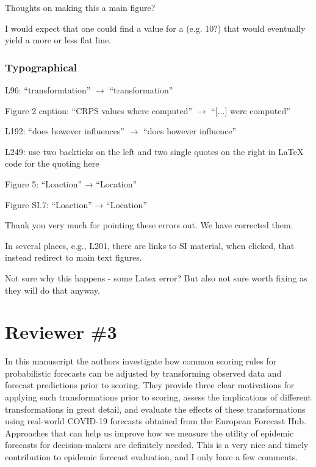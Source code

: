 \documentclass{article}
\newcommand{\red}{\color{red}}
\newcommand{\black}{\color{black}}
\newcommand{\blue}{\color{blue}}
\begin{document}
Thoughts on making this a main figure? 

I would expect that one could find a value for a (e.g. 10?) that would eventually yield a more or less flat line. 

\blue
\subsubsection{Typographical}
\blue
L96: “transformtation” $\xrightarrow{}$ “transformation”

Figure 2 caption: “CRPS values where computed” $\xrightarrow{}$ “[...] were computed”

L192: “does however influences” $\xrightarrow{}$ “does however influence”

L249: use two backticks on the left and two single quotes on the right in LaTeX code for the quoting here




Figure 5: “Loaction” → “Location”

Figure SI.7: “Loaction” → “Location”

\black
Thank you very much for pointing these errors out. We have corrected them. 


\red
In several places, e.g., L201, there are links to SI material, when clicked, that instead redirect to main text figures.

\black
Not sure why this happens - some Latex error? But also not sure worth fixing as they will do that anyway. 


















\red
\section{Reviewer \#3}

\blue
In this manuscript the authors investigate how common scoring rules for probabilistic forecasts can be adjusted by transforming observed data and forecast predictions prior to scoring. They provide three clear motivations for applying such transformations prior to scoring, assess the implications of different transformations in great detail, and evaluate the effects of these transformations using real-world COVID-19 forecasts obtained from the European Forecast Hub. Approaches that can help us improve how we measure the utility of epidemic forecasts for decision-makers are definitely needed. This is a very nice and timely contribution to epidemic forecast evaluation, and I only have a few comments.
\end{document}
